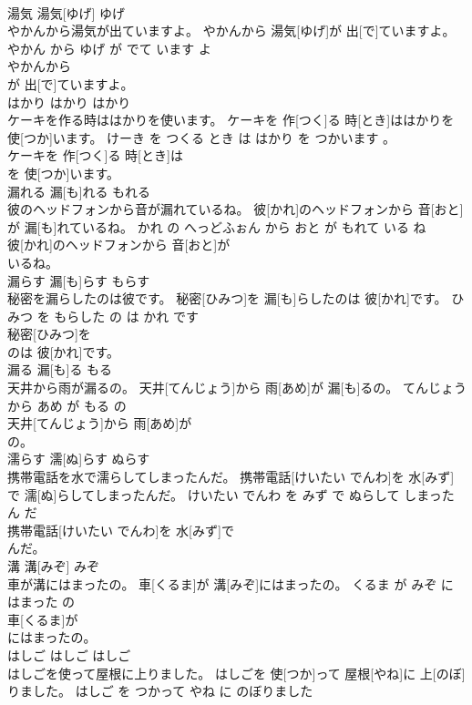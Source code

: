 \documentclass[8pt]{extreport}
\begin{document}
\begin{CJK}{UTF8}{min}
\\	湯気	湯気[ゆげ]	ゆげ	
\\	やかんから湯気が出ていますよ。	やかんから 湯気[ゆげ]が 出[で]ていますよ。	やかん から ゆげ が でて います よ	
\\	やかんから
\\	が 出[で]ていますよ。			
\\	はかり	はかり	はかり	
\\	ケーキを作る時ははかりを使います。	ケーキを 作[つく]る 時[とき]ははかりを 使[つか]います。	けーき を つくる とき は はかり を つかいます 。	
\\	ケーキを 作[つく]る 時[とき]は
\\	を 使[つか]います。			
\\	漏れる	漏[も]れる	もれる	
\\	彼のヘッドフォンから音が漏れているね。	彼[かれ]のヘッドフォンから 音[おと]が 漏[も]れているね。	かれ の へっどふぉん から おと が もれて いる ね	
\\	彼[かれ]のヘッドフォンから 音[おと]が
\\	いるね。			
\\	漏らす	漏[も]らす	もらす	
\\	秘密を漏らしたのは彼です。	秘密[ひみつ]を 漏[も]らしたのは 彼[かれ]です。	ひみつ を もらした の は かれ です	
\\	秘密[ひみつ]を
\\	のは 彼[かれ]です。			
\\	漏る	漏[も]る	もる	
\\	天井から雨が漏るの。	天井[てんじょう]から 雨[あめ]が 漏[も]るの。	てんじょう から あめ が もる の	
\\	天井[てんじょう]から 雨[あめ]が
\\	の。			
\\	濡らす	濡[ぬ]らす	ぬらす	
\\	携帯電話を水で濡らしてしまったんだ。	携帯電話[けいたい でんわ]を 水[みず]で 濡[ぬ]らしてしまったんだ。	けいたい でんわ を みず で ぬらして しまった ん だ	
\\	携帯電話[けいたい でんわ]を 水[みず]で
\\	んだ。			
\\	溝	溝[みぞ]	みぞ	
\\	車が溝にはまったの。	車[くるま]が 溝[みぞ]にはまったの。	くるま が みぞ に はまった の	
\\	車[くるま]が
\\	にはまったの。			
\\	はしご	はしご	はしご	
\\	はしごを使って屋根に上りました。	はしごを 使[つか]って 屋根[やね]に 上[のぼ]りました。	はしご を つかって やね に のぼりました	

\end{CJK}
\end{document}

